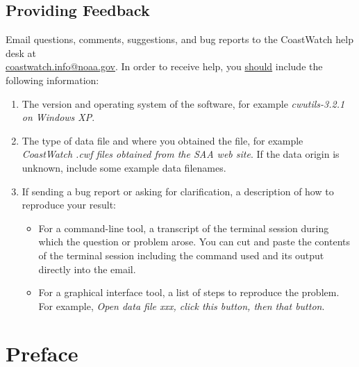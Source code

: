 \section*{Providing Feedback}

Email questions, comments, suggestions, and bug reports to the
CoastWatch help desk at \\
\href{mailto:coastwatch.info@noaa.gov}{coastwatch.info@noaa.gov}.
In order to receive help, you \underline{should} include the
following information:
\begin{enumerate}

  \item The version and operating system of the software, for
  example {\em cwutils-3.2.1 on Windows XP}.

  \item The type of data file and where you obtained the file,
  for example {\em CoastWatch .cwf files obtained from the SAA web
  site}.  If the data origin is unknown, include some example data
  filenames.

  \item If sending a bug report or asking for clarification, a
  description of how to reproduce your result:
  \begin{itemize}

    \item For a command-line tool, a transcript of the terminal
    session during which the question or problem arose.  You
    can cut and paste the contents
    of the terminal session including the command used and its output
    directly into the email.

    \item For a graphical interface tool, a list of steps to
    reproduce the problem.  For example, {\em
    Open data file xxx, click this button, then that button}.

  \end{itemize}

\end{enumerate}

\newpage

\tableofcontents
\newpage

\listoffigures
\newpage

\setcounter{page}{1}

\chapter*{Preface}

